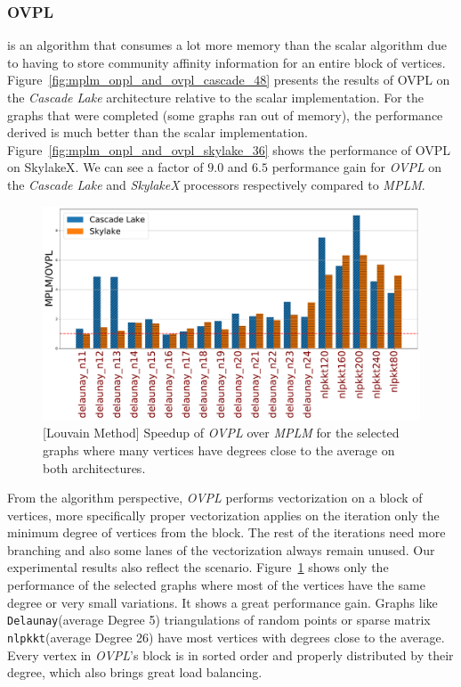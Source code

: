\documentclass[default,iicol]{sn-jnl}%
\theoremstyle{thmstyleone}%
\theoremstyle{thmstyletwo}%
\theoremstyle{thmstylethree}%
\begin{document}
\subsubsection{OVPL}
is an algorithm that consumes a lot more memory than the scalar
algorithm due to having to store community affinity information for an
entire block of
vertices. Figure~\ref{fig:mplm_onpl_and_ovpl_cascade_48} presents the
results of OVPL on the \textit{Cascade Lake} architecture relative to
the scalar implementation. For the graphs that were completed (some graphs
ran out of memory), the performance derived is much better than the
scalar implementation. Figure~\ref{fig:mplm_onpl_and_ovpl_skylake_36}
shows the performance of OVPL on SkylakeX. We can
see a factor of $9.0$ and $6.5$ performance gain for \textit{OVPL} on
the \textit{Cascade Lake} and \textit{SkylakeX} processors
respectively compared to \textit{MPLM}.

\begin{figure}[t]
  \centering
  \includegraphics[width=.48\linewidth]{figures/louvain/selected_mplm_vs_ovpl_cascade_48_skl_36.pdf}
  \caption{[Louvain Method] Speedup of \textit{OVPL} over \textit{MPLM} for the selected graphs where many vertices have degrees close to the average on both architectures.}
  \label{fig:mplm_vs_ovpl_cascade_48_skylake_36}
\end{figure}

From the algorithm perspective, \textit{OVPL} performs vectorization on a block of vertices, more specifically proper vectorization 
applies on the iteration only the minimum degree of vertices from the block. The rest of the iterations need more branching 
and also some lanes of the vectorization always remain unused. Our experimental results also reflect the scenario. Figure~\ref{fig:mplm_vs_ovpl_cascade_48_skylake_36} 
shows only the performance of the selected graphs where most of the vertices have the same degree or very small variations. 
It shows a great performance gain. Graphs like \texttt{Delaunay}(average Degree 5) triangulations of random points or sparse matrix 
\texttt{nlpkkt}(average Degree 26) have most vertices with degrees close to the average. Every vertex in \textit{OVPL}’s block is in sorted 
order and properly distributed by their degree, which also brings great load balancing. 
\end{document}
